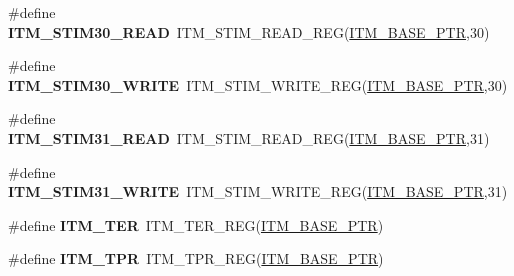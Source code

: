 \begin{DoxyCompactItemize}
\item 
\hypertarget{group___i_t_m___register___accessor___macros_ga24e46238f0f743da6b080a2cbb500ff5}{}\#define {\bfseries I\+T\+M\+\_\+\+S\+T\+I\+M30\+\_\+\+R\+E\+A\+D}~I\+T\+M\+\_\+\+S\+T\+I\+M\+\_\+\+R\+E\+A\+D\+\_\+\+R\+E\+G(\hyperlink{group___i_t_m___peripheral_gafaddee8fe8b6a898d4e5edc43ee0d703}{I\+T\+M\+\_\+\+B\+A\+S\+E\+\_\+\+P\+T\+R},30)\label{group___i_t_m___register___accessor___macros_ga24e46238f0f743da6b080a2cbb500ff5}

\item 
\hypertarget{group___i_t_m___register___accessor___macros_ga04082ae600d9a3012f4c9861fe7d0ea3}{}\#define {\bfseries I\+T\+M\+\_\+\+S\+T\+I\+M30\+\_\+\+W\+R\+I\+T\+E}~I\+T\+M\+\_\+\+S\+T\+I\+M\+\_\+\+W\+R\+I\+T\+E\+\_\+\+R\+E\+G(\hyperlink{group___i_t_m___peripheral_gafaddee8fe8b6a898d4e5edc43ee0d703}{I\+T\+M\+\_\+\+B\+A\+S\+E\+\_\+\+P\+T\+R},30)\label{group___i_t_m___register___accessor___macros_ga04082ae600d9a3012f4c9861fe7d0ea3}

\item 
\hypertarget{group___i_t_m___register___accessor___macros_ga6643b5b69131aa2163f02c7d27c2305c}{}\#define {\bfseries I\+T\+M\+\_\+\+S\+T\+I\+M31\+\_\+\+R\+E\+A\+D}~I\+T\+M\+\_\+\+S\+T\+I\+M\+\_\+\+R\+E\+A\+D\+\_\+\+R\+E\+G(\hyperlink{group___i_t_m___peripheral_gafaddee8fe8b6a898d4e5edc43ee0d703}{I\+T\+M\+\_\+\+B\+A\+S\+E\+\_\+\+P\+T\+R},31)\label{group___i_t_m___register___accessor___macros_ga6643b5b69131aa2163f02c7d27c2305c}

\item 
\hypertarget{group___i_t_m___register___accessor___macros_gab792df922db5e627bc1d9917ff6b4ac2}{}\#define {\bfseries I\+T\+M\+\_\+\+S\+T\+I\+M31\+\_\+\+W\+R\+I\+T\+E}~I\+T\+M\+\_\+\+S\+T\+I\+M\+\_\+\+W\+R\+I\+T\+E\+\_\+\+R\+E\+G(\hyperlink{group___i_t_m___peripheral_gafaddee8fe8b6a898d4e5edc43ee0d703}{I\+T\+M\+\_\+\+B\+A\+S\+E\+\_\+\+P\+T\+R},31)\label{group___i_t_m___register___accessor___macros_gab792df922db5e627bc1d9917ff6b4ac2}

\item 
\hypertarget{group___i_t_m___register___accessor___macros_ga18c94f3236b7d64c83e63cdd586e5e9b}{}\#define {\bfseries I\+T\+M\+\_\+\+T\+E\+R}~I\+T\+M\+\_\+\+T\+E\+R\+\_\+\+R\+E\+G(\hyperlink{group___i_t_m___peripheral_gafaddee8fe8b6a898d4e5edc43ee0d703}{I\+T\+M\+\_\+\+B\+A\+S\+E\+\_\+\+P\+T\+R})\label{group___i_t_m___register___accessor___macros_ga18c94f3236b7d64c83e63cdd586e5e9b}

\item 
\hypertarget{group___i_t_m___register___accessor___macros_ga4a106555b6d58115c86e09d48e199572}{}\#define {\bfseries I\+T\+M\+\_\+\+T\+P\+R}~I\+T\+M\+\_\+\+T\+P\+R\+\_\+\+R\+E\+G(\hyperlink{group___i_t_m___peripheral_gafaddee8fe8b6a898d4e5edc43ee0d703}{I\+T\+M\+\_\+\+B\+A\+S\+E\+\_\+\+P\+T\+R})\label{group___i_t_m___register___accessor___macros_ga4a106555b6d58115c86e09d48e199572}


\end{DoxyCompactItemize}
